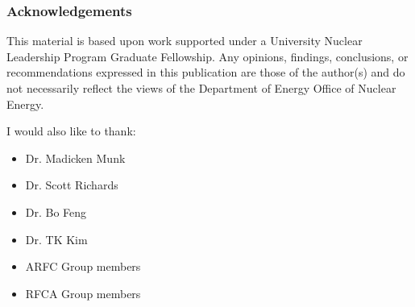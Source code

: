 \begin{frame}
    \frametitle{Acknowledgements}
    This material is based upon work supported under a University 
        Nuclear Leadership Program Graduate Fellowship. Any opinions, findings, conclusions, or 
    recommendations expressed in this publication are those of the author(s) 
    and do not necessarily reflect the views of the Department of Energy Office 
    of Nuclear Energy.
        
    I would also like to thank:
    \begin{itemize}
        \item Dr. Madicken Munk
        \item Dr. Scott Richards
        \item Dr. Bo Feng
        \item Dr. TK Kim
        \item ARFC Group members
        \item RFCA Group members
    \end{itemize}

\end{frame}